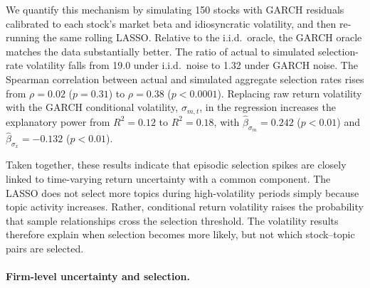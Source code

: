 We quantify this mechanism by simulating 150 stocks with GARCH residuals calibrated to each stock's market beta and idiosyncratic volatility, and then re-running the same rolling LASSO. Relative to the i.i.d.\ oracle, the GARCH oracle matches the data substantially better. The ratio of actual to simulated selection-rate volatility falls from 19.0 under i.i.d.\ noise to 1.32 under GARCH noise. The Spearman correlation between actual and simulated aggregate selection rates rises from $\rho=0.02$ ($p=0.31$) to $\rho=0.38$ ($p<0.0001$). Replacing raw return volatility with the GARCH conditional volatility, $\sigma_{m,t}$, in the regression increases the explanatory power from $R^2=0.12$ to $R^2=0.18$, with $\hat\beta_{\sigma_m}=0.242$ ($p<0.01$) and $\hat\beta_{\sigma_x}=-0.132$ ($p<0.01$).


Taken together, these results indicate that episodic selection spikes are closely linked to time-varying return uncertainty with a common component. The LASSO does not select more topics during high-volatility periods simply because topic activity increases. Rather, conditional return volatility raises the probability that sample relationships cross the selection threshold. The volatility results therefore explain when selection becomes more likely, but not which stock--topic pairs are selected.

\paragraph{Firm-level uncertainty and selection.}

